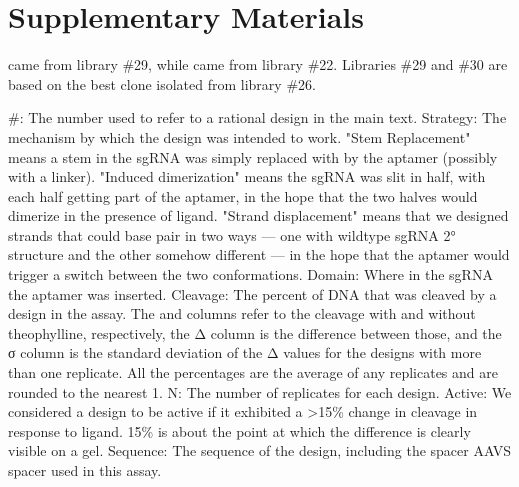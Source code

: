 \documentclass[10pt,oneside]{article}
\begin{document}
\section{Supplementary Materials}






      \ligrnaF{} came from library \#29, while \ligrnaB{} came from library \#22.  Libraries \#29 and \#30 are based on the best clone isolated from library \#26.



    \#: The number used to refer to a rational design in the main text.
    Strategy: The mechanism by which the design was intended to work.  "Stem Replacement" means a stem in the sgRNA was simply replaced with by the aptamer (possibly with a linker).  "Induced dimerization" means the sgRNA was slit in half, with each half getting part of the aptamer, in the hope that the two halves would dimerize in the presence of ligand.  "Strand displacement" means that we designed strands that could base pair in two ways --- one with wildtype sgRNA 2° structure and the other somehow different --- in the hope that the aptamer would trigger a switch between the two conformations.
    Domain: Where in the sgRNA the aptamer was inserted.
    Cleavage: The percent of DNA that was cleaved by a design in the \invitro{} assay.  The \apo{} and \holo{} columns refer to the cleavage with and without theophylline, respectively, the Δ column is the difference between those, and the σ column is the standard deviation of the Δ values for the designs with more than one replicate.  All the percentages are the average of any replicates and are rounded to the nearest 1.
    N: The number of replicates for each design.
    Active: We considered a design to be active if it exhibited a >15\% change in cleavage in response to ligand.  15\% is about the point at which the difference is clearly visible on a gel.
    Sequence: The sequence of the design, including the spacer AAVS spacer used in this assay.
\end{document}

